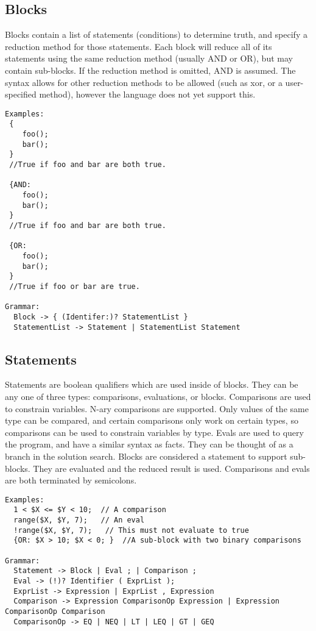 \documentclass[onecolumn,titlepage]{article}
\begin{document}
\subsection{Blocks}
Blocks contain a list of statements (conditions) to determine truth, and specify a reduction 
method for those statements.  Each block will reduce all of its statements using the same
reduction method (usually AND or OR), but may contain sub-blocks.  If the reduction method
is omitted, AND is assumed.  The syntax allows for other reduction methods to be allowed
(such as xor, or a user-specified method), however the language does not yet support this.
\begin{verbatim}
Examples:
 { 
    foo();
    bar();
 }
 //True if foo and bar are both true.

 {AND:
    foo();
    bar();
 }
 //True if foo and bar are both true.

 {OR:
    foo();
    bar();
 }
 //True if foo or bar are true.

Grammar:
  Block -> { (Identifer:)? StatementList }
  StatementList -> Statement | StatementList Statement
\end{verbatim}

\subsection{Statements}
Statements are boolean qualifiers which are used inside of blocks.  They can be any one
of three types: comparisons, evaluations, or blocks. Comparisons are used to constrain variables.
N-ary comparisons are supported.  Only values of the same type can be compared, and certain
comparisons only work on certain types, so comparisons can be used to constrain variables by 
type.  Evals are used to query the program, and have a similar syntax as facts.  They can be thought
of as a branch in the solution search.  Blocks are considered a statement to support sub-blocks.
They are evaluated and the reduced result is used.  Comparisons and evals are both terminated
by semicolons.

\begin{verbatim}
Examples:
  1 < $X <= $Y < 10;  // A comparison
  range($X, $Y, 7);   // An eval
  !range($X, $Y, 7);   // This must not evaluate to true
  {OR: $X > 10; $X < 0; }  //A sub-block with two binary comparisons

Grammar:
  Statement -> Block | Eval ; | Comparison ;
  Eval -> (!)? Identifier ( ExprList );
  ExprList -> Expression | ExprList , Expression
  Comparison -> Expression ComparisonOp Expression | Expression ComparisonOp Comparison
  ComparisonOp -> EQ | NEQ | LT | LEQ | GT | GEQ
\end{verbatim}
\end{document}

